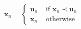 \begin{equation}
\mathbf{x}_{n}=\left\{\begin{array}{ll}{\mathbf{u}_{n}} & {\text { if } \mathbf{x}_{n} \prec \mathbf{u}_{n}} \\ {\mathbf{x}_{n}} & {\text { otherwise }}\end{array}\right.
\label{selection_constraint}
\end{equation}